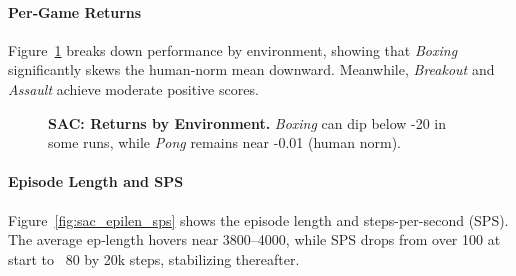 \paragraph{Per‐Game Returns}
Figure~\ref{fig:sac_returns_pergame} breaks down performance by environment, showing that \emph{Boxing} significantly skews the human‐norm mean downward. Meanwhile, \emph{Breakout} and \emph{Assault} achieve moderate positive scores.

\begin{figure}[htbp]
	\centering
	\quad
	\caption{\textbf{SAC: Returns by Environment.}
		\emph{Boxing} can dip below -20 in some runs, while \emph{Pong} remains near -0.01 (human norm).}
	\label{fig:sac_returns_pergame}
\end{figure}

\paragraph{Episode Length and SPS}
Figure~\ref{fig:sac_epilen_sps} shows the episode length and steps-per-second (SPS). The average ep‐length hovers near 3800–4000, while SPS drops from over 100 at start to ~80 by 20k steps, stabilizing thereafter.


